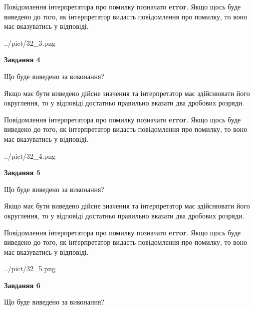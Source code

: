 \documentclass[12pt, ukrainian]{article}
\begin{document}
{\begin {Large}
Повідомлення інтерпретатора про помилку позначати \textbf{error}.
Якщо щось буде виведено до того, як інтерпретатор видасть повідомлення про помилку, 
то воно має вказуватись у відповіді. \par

\begin{center}
	{../pict/32_3.png}
\end{center}
\newpage

{\begin {center}\textbf{Завдання 4}\end {center}}\par
Що буде виведено за виконання? \par

Якщо має бути виведено дійсне значення та інтерпретатор має здійснювати його округлення, 
то у відповіді достатньо правильно вказати два дробових розряди.

Повідомлення інтерпретатора про помилку позначати \textbf{error}.
Якщо щось буде виведено до того, як інтерпретатор видасть повідомлення про помилку, 
то воно має вказуватись у відповіді. \par

\begin{center}
	{../pict/32_4.png}
\end{center}
\newpage

{\begin {center}\textbf{Завдання 5}\end {center}}\par
Що буде виведено за виконання? \par

Якщо має бути виведено дійсне значення та інтерпретатор має здійснювати його округлення, 
то у відповіді достатньо правильно вказати два дробових розряди.

Повідомлення інтерпретатора про помилку позначати \textbf{error}.
Якщо щось буде виведено до того, як інтерпретатор видасть повідомлення про помилку, 
то воно має вказуватись у відповіді. \par

\begin{center}
	{../pict/32_5.png}
\end{center}
\newpage

{\begin {center}\textbf{Завдання 6}\end {center}}\par
Що буде виведено за виконання? \par


\end{Large}}
\end{document}

